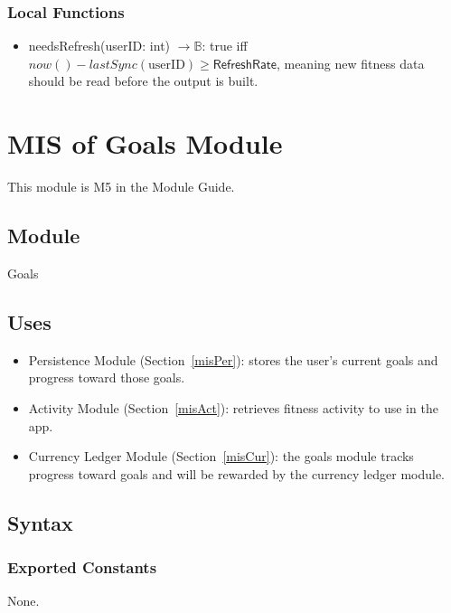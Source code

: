\documentclass[12pt, titlepage]{article}
\begin{document}
\subsubsection{Local Functions}
\begin{itemize}
    \item needsRefresh(userID: int) $\longrightarrow \mathbb{B}$: true iff $\mathit{now}() - \mathit{lastSync}(\mathrm{userID}) \geq \textsf{RefreshRate}$, meaning new fitness data should be read before the output is built.
\end{itemize}

\section{MIS of Goals Module} \label{misGoal}

This module is M5 in the Module Guide.

\subsection{Module}
Goals

\subsection{Uses}
\begin{itemize}
    \item Persistence Module (Section~\ref{misPer}): stores the user's current goals and progress toward those goals.
    \item Activity Module (Section~\ref{misAct}): retrieves fitness activity to use in the app.
    \item Currency Ledger Module (Section~\ref{misCur}): the goals module tracks progress toward goals and will be rewarded by the currency ledger module. 
\end{itemize}

\subsection{Syntax}

\subsubsection{Exported Constants}
None. 
\end{document}
